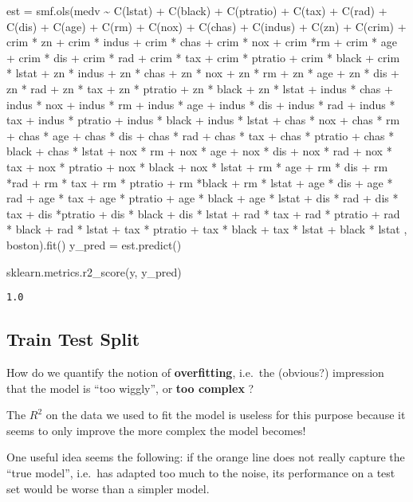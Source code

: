 \documentclass[
  letterpaper,
  DIV=11,
  numbers=noendperiod]{scrreprt}
\newenvironment{Shaded}{\begin{snugshade}}{\end{snugshade}}
\newcommand{\NormalTok}[1]{\textcolor[rgb]{0.00,0.23,0.31}{#1}}
\newcommand{\OperatorTok}[1]{\textcolor[rgb]{0.37,0.37,0.37}{#1}}
\newcommand{\StringTok}[1]{\textcolor[rgb]{0.13,0.47,0.30}{#1}}
\begin{document}
\begin{Shaded}
\begin{Highlighting}[]
\NormalTok{est }\OperatorTok{=}\NormalTok{ smf.ols(}\StringTok{\textquotesingle{}medv \textasciitilde{} C(lstat) + C(black) + C(ptratio) + C(tax) + C(rad) + C(dis) + C(age) + C(rm) + C(nox) + C(chas) + C(indus) + C(zn) + C(crim) + crim * zn + crim * indus + crim * chas + crim * nox + crim *rm + crim * age + crim * dis + crim * rad + crim * tax + crim * ptratio + crim * black + crim * lstat + zn * indus + zn * chas + zn * nox + zn * rm + zn * age + zn * dis + zn * rad + zn * tax + zn * ptratio + zn * black + zn * lstat + indus * chas + indus * nox + indus * rm + indus * age + indus * dis + indus * rad + indus * tax + indus * ptratio + indus * black + indus * lstat + chas * nox + chas * rm + chas * age + chas * dis + chas * rad + chas * tax + chas * ptratio + chas * black + chas * lstat + nox * rm + nox * age + nox * dis + nox * rad + nox * tax + nox * ptratio + nox * black + nox * lstat + rm * age + rm * dis + rm *rad + rm * tax + rm * ptratio + rm *black + rm * lstat + age * dis + age * rad + age * tax + age * ptratio + age * black + age * lstat + dis * rad + dis * tax + dis *ptratio + dis * black + dis * lstat + rad * tax + rad * ptratio + rad * black + rad * lstat + tax * ptratio + tax * black + tax * lstat + black * lstat \textquotesingle{}}\NormalTok{, boston).fit()}
\NormalTok{y\_pred }\OperatorTok{=}\NormalTok{ est.predict()}

\NormalTok{sklearn.metrics.r2\_score(y, y\_pred)}
\end{Highlighting}
\end{Shaded}

\begin{verbatim}
1.0
\end{verbatim}

\hypertarget{train-test-split}{%
\subsection{Train Test Split}\label{train-test-split}}

How do we quantify the notion of \textbf{overfitting}, i.e.~the
(obvious?) impression that the model is ``too wiggly'', or \textbf{too
complex} ?

The \(R^2\) on the data we used to fit the model is useless for this
purpose because it seems to only improve the more complex the model
becomes!

One useful idea seems the following: if the orange line does not really
capture the ``true model'', i.e.~has adapted too much to the noise, its
performance on a test set would be worse than a simpler model.
\end{document}
